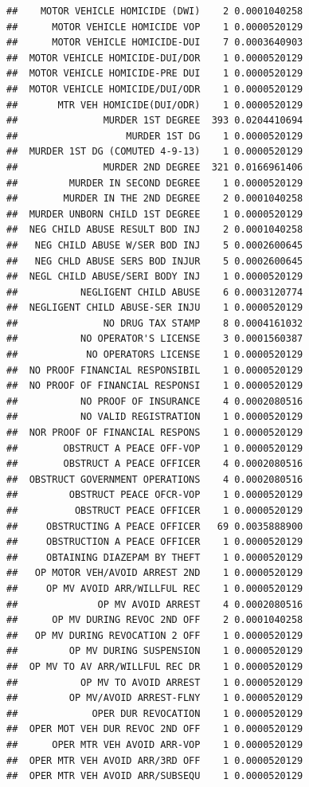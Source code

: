 \documentclass[]{book}
\begin{document}
\begin{verbatim}
##    MOTOR VEHICLE HOMICIDE (DWI)    2 0.0001040258
##      MOTOR VEHICLE HOMICIDE VOP    1 0.0000520129
##      MOTOR VEHICLE HOMICIDE-DUI    7 0.0003640903
##  MOTOR VEHICLE HOMICIDE-DUI/DOR    1 0.0000520129
##  MOTOR VEHICLE HOMICIDE-PRE DUI    1 0.0000520129
##  MOTOR VEHICLE HOMICIDE/DUI/ODR    1 0.0000520129
##       MTR VEH HOMICIDE(DUI/ODR)    1 0.0000520129
##               MURDER 1ST DEGREE  393 0.0204410694
##                   MURDER 1ST DG    1 0.0000520129
##  MURDER 1ST DG (COMUTED 4-9-13)    1 0.0000520129
##               MURDER 2ND DEGREE  321 0.0166961406
##         MURDER IN SECOND DEGREE    1 0.0000520129
##        MURDER IN THE 2ND DEGREE    2 0.0001040258
##  MURDER UNBORN CHILD 1ST DEGREE    1 0.0000520129
##  NEG CHILD ABUSE RESULT BOD INJ    2 0.0001040258
##   NEG CHILD ABUSE W/SER BOD INJ    5 0.0002600645
##   NEG CHLD ABUSE SERS BOD INJUR    5 0.0002600645
##  NEGL CHILD ABUSE/SERI BODY INJ    1 0.0000520129
##           NEGLIGENT CHILD ABUSE    6 0.0003120774
##  NEGLIGENT CHILD ABUSE-SER INJU    1 0.0000520129
##               NO DRUG TAX STAMP    8 0.0004161032
##           NO OPERATOR'S LICENSE    3 0.0001560387
##            NO OPERATORS LICENSE    1 0.0000520129
##  NO PROOF FINANCIAL RESPONSIBIL    1 0.0000520129
##  NO PROOF OF FINANCIAL RESPONSI    1 0.0000520129
##           NO PROOF OF INSURANCE    4 0.0002080516
##           NO VALID REGISTRATION    1 0.0000520129
##  NOR PROOF OF FINANCIAL RESPONS    1 0.0000520129
##        OBSTRUCT A PEACE OFF-VOP    1 0.0000520129
##        OBSTRUCT A PEACE OFFICER    4 0.0002080516
##  OBSTRUCT GOVERNMENT OPERATIONS    4 0.0002080516
##         OBSTRUCT PEACE OFCR-VOP    1 0.0000520129
##          OBSTRUCT PEACE OFFICER    1 0.0000520129
##     OBSTRUCTING A PEACE OFFICER   69 0.0035888900
##     OBSTRUCTION A PEACE OFFICER    1 0.0000520129
##     OBTAINING DIAZEPAM BY THEFT    1 0.0000520129
##   OP MOTOR VEH/AVOID ARREST 2ND    1 0.0000520129
##     OP MV AVOID ARR/WILLFUL REC    1 0.0000520129
##              OP MV AVOID ARREST    4 0.0002080516
##      OP MV DURING REVOC 2ND OFF    2 0.0001040258
##   OP MV DURING REVOCATION 2 OFF    1 0.0000520129
##         OP MV DURING SUSPENSION    1 0.0000520129
##  OP MV TO AV ARR/WILLFUL REC DR    1 0.0000520129
##           OP MV TO AVOID ARREST    1 0.0000520129
##         OP MV/AVOID ARREST-FLNY    1 0.0000520129
##             OPER DUR REVOCATION    1 0.0000520129
##  OPER MOT VEH DUR REVOC 2ND OFF    1 0.0000520129
##      OPER MTR VEH AVOID ARR-VOP    1 0.0000520129
##  OPER MTR VEH AVOID ARR/3RD OFF    1 0.0000520129
##  OPER MTR VEH AVOID ARR/SUBSEQU    1 0.0000520129

\end{verbatim}
\end{document}
